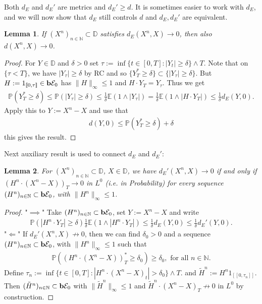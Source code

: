 \documentclass[12pt,a4paper, twoside]{article}
\newtheorem{lem}{Lemma}[section]
\theoremstyle{definition}
\newcommand{\EE}{\mathbb{E}} %
\newcommand{\PP}{\mathbb{P}} %
\newcommand{\simple}{\textbf{\text{b}}\mathcal{E}}
\begin{document}
Both $d_E$ and $d_E' $ are metrics and $d_E' \geq d$. It is sometimes easier to work with $d_E$, and we will now show that $d_E$ still controls $d$ and $d_E, d_E'$ are equivalent. 
\newpage
\begin{lem} \label{L31} If $(X^n)_{n \in \mathbb{N}} \subset \mathbb{D}$ satisfies $d_E(X^n, X) \to 0$, then also $d(X^n, X) \to 0$. 
\end{lem}
\begin{proof}
For $Y \in \mathbb{D}$ and $\delta >0$ set $\tau := \inf \{ t \in [0,T]: |Y_t| \geq \delta \} \wedge T$. Note that on $\{ \tau < T\}$, we have $|Y_\tau| \geq \delta$ by RC and so $\{ Y_T^* \geq \delta \} \subset \{ | Y_\tau| \geq \delta\}$. But $H:= 1_{[\![ 0 ,\tau ]\!]} \in \simple_0$ has $\|H\|_\infty \leq 1$ and $H \cdot Y_T = Y_\tau$. Thus we get 
\begin{align*}
\PP( Y_T^* \geq \delta) \leq \PP( |Y_\tau| \geq \delta) \leq \frac{1}{\delta} \EE( 1 \wedge | Y_\tau|)  = \frac{1}{\delta} \EE(1 \wedge | H \cdot Y_T|) \leq \frac{1}{\delta} d_E(Y,0).
\end{align*}
Apply this to $Y:= X^n-X$ and use that 
\begin{align*}
d(Y,0) \leq \PP( Y_T^* \geq \delta) + \delta
\end{align*}
this gives the result. 
\end{proof}
Next auxiliary result is used to connect $d_E$ and $d_E'$: 
\begin{lem}\label{L32} For $(X^n)_{n \in \mathbb{N}} \subset \mathbb{D}$, $X \in \mathbb{D}$, we have $d_E' (X^n, X) \to 0$ if and only if $(H^n \cdot (X^n-X))_T \to 0$ in $L^0$ (i.e. in Probability) for every sequence $(H^n)_{n \in \mathbb{N}} \subset \simple_0$, with $\|H^n \|_\infty \leq 1$. 
\end{lem}
\begin{proof}
"$\implies$" Take $(H^n)_{n \in \mathbb{N}} \subset \simple_0$, set $Y:= X^n-X$ and write 
\begin{align*}
\PP(|H^n \cdot Y_T| \geq \delta) \frac{1}{\delta} \EE(1 \wedge |H^n \cdot Y_T|) \leq \frac{1}{\delta}d_E(Y,0) \leq \frac{1}{\delta}d_E' (Y,0). 
\end{align*}
"$\Longleftarrow$" If $d_E' (X^n,X) \not\to 0$, then we can find $\delta_0>0$ and a sequence $(H^n)_{n \in \mathbb{N}} \subset \simple_0$, with $\|H^n\|_\infty \leq 1$ such that 
\begin{align*}
\PP((H^n \cdot (X^n-X))_T^* \geq \delta_0) \geq \delta_0, \text{ for all } n \in \mathbb{N}.
\end{align*}
Define $\tau_n:= \inf \{ t \in [0,T] : |H^n \cdot (X^n-X)_t| > \delta_0 \} \wedge T$. and $\tilde{H}^n := H^n 1_{ [\![ 0, \tau_n ]\!]}$.  Then $(\tilde{H}^n)_{n \in \mathbb{N}} \subset \simple_0$ with $\| \tilde{H}^n \|_\infty \leq 1$ and $\tilde{H}^n  \cdot (X^n-X)_T \not \to 0$ in $L^0$ by construction.  
\end{proof}
\end{document}

